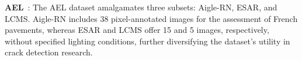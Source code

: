 \documentclass[journal]{IEEEtran}
\begin{document}
\textbf{AEL}~\cite{DBLP:journals/tits/AmhazCIB16}: The AEL dataset amalgamates three subsets: Aigle-RN, ESAR, and LCMS. Aigle-RN includes 38 pixel-annotated images for the assessment of French pavements, whereas ESAR and LCMS offer 15 and 5 images, respectively, without specified lighting conditions, further diversifying the dataset's utility in crack detection research.















\end{document}
